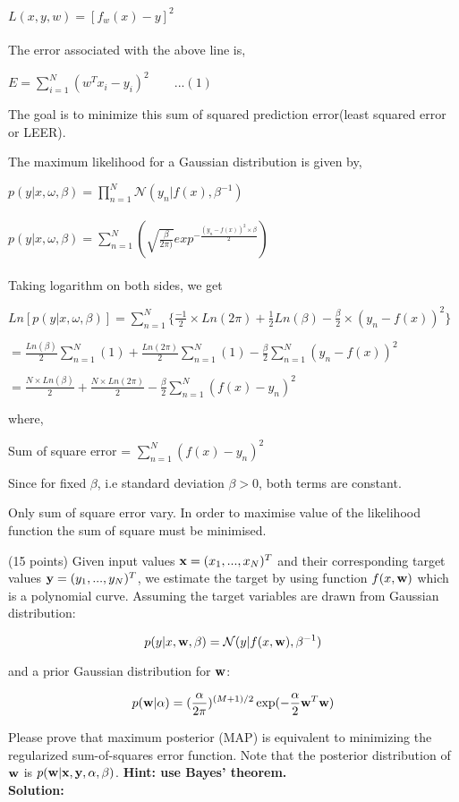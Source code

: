 \documentclass{exam}
\newcommand{\xx}{{\bf{x}}}
\newcommand{\yy}{{\bf{y}}}
\newcommand{\ww}{{\bf{w}}}
\begin{document}
\begin{questions}
$L(x,y,w) = [f_{w}(x) - y]^2$\\\\
The error associated with the above line is,

$E = \sum_{i=1}^{N} (w^{T}x_{i} - y_{i})^2 \quad \quad ...(1)$

The goal is to minimize this sum of squared prediction error(least squared error or LEER).

The maximum likelihood for a Gaussian distribution is given by,

$p(y|x ,\omega, \beta) = \prod_{n=1}^{N} \mathcal{N}(y_{n} | f(x),\beta^{-1})$\\\\
$p(y|x ,\omega, \beta) = \sum_{n=1}^{N} (\sqrt{\frac{\beta}{{2\pi})}} exp^{- \frac{(y_{n}- f(x))^2\times \beta}{2}})$\\\\
Taking logarithm on both sides, we get

$Ln[p(y|x ,\omega, \beta)] = \sum_{n=1}^{N} \{ \frac{-1}{2}\times Ln(2\pi) + \frac{1}{2} Ln(\beta) -\frac{\beta}{2} \times (y_{n} - f(x))^2 \}$


$= \frac{Ln(\beta)}{2}\sum_{n=1}^{N} (1) + \frac{Ln(2\pi)}{2}\sum_{n=1}^{N} (1) - \frac{\beta}{2}\sum_{n=1}^{N} (y_{n} - f(x))^2 $

$= \frac{N\times Ln(\beta)}{2} + \frac{N\times Ln(2\pi)}{2} - \frac{\beta}{2}\sum_{n=1}^{N} (f(x) - y_{n})^2 $

where,

Sum of square error = $\sum_{n=1}^{N} (f(x) - y_{n})^2$ 

Since for fixed $\beta$, i.e standard deviation $\beta > 0$, both terms are constant.

Only sum of square error vary. In order to maximise value of the likelihood function the sum of square must be minimised.


\newpage
{} (15 points) Given input values $\xx= (x_1,...,x_N)^T$ and their corresponding target values $\yy= (y_1,...,y_N)^T$, we estimate the target by using function $f(x,\ww)$ which is a polynomial curve. Assuming the target variables are drawn from Gaussian distribution:

$$p(y|x, \ww,\beta) = \mathcal{N} (y | f(x,\ww), \beta^{-1})$$

and  a prior Gaussian distribution for $\ww$:

$$p(\ww|\alpha) = (\frac{\alpha}{2\pi})^{(M+1)/2} \exp(-\frac{\alpha}{2} \ww^T\ww)$$

Please prove that maximum posterior (MAP) is equivalent to minimizing the regularized sum-of-squares error function. Note that the posterior distribution of $\ww$ is $p(\ww|\xx,\yy,\alpha,\beta)$. \textbf{Hint: use Bayes' theorem.}\\
\textbf{Solution:}\\


\end{questions}
\end{document}
